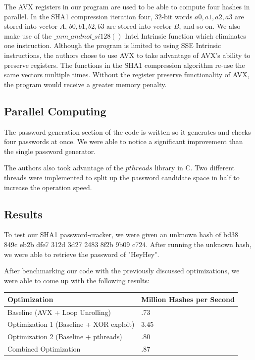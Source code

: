 \documentclass[letterpaper, 10 pt, conference]{ieeeconf}  %
\begin{document}
The AVX registers in our program are used to be able to compute four hashes in parallel.  In the SHA1 compression iteration four, 32-bit words $a0, a1, a2, a3$ are stored into vector $A$, $b0, b1, b2, b3$ are stored into vector $B$, and so on.  We also make use of the $\_mm\_andnot\_si128()$ Intel Intrinsic function which eliminates one instruction.  Although the program is limited to using SSE Intrinsic instructions, the authors chose to use AVX to take advantage of AVX's ability to preserve registers.  The functions in the SHA1 compression algorithm re-use the same vectors multiple times.  Without the register preserve functionality of AVX, the program would receive a greater memory penalty.  

\subsection{Parallel Computing}

The password generation section of the code is written so it generates and checks four passwords at once.  We were able to notice a significant improvement than the single password generator.

The authors also took advantage of the $pthreads$ library in C.  Two different threads were implemented to split up the password candidate space in half to increase the operation speed. 

\subsection{Results}

To test our SHA1 password-cracker, we were given an unknown hash of bd38 849c eb2b dfe7 312d 3d27 2483 8f2b 9b09 c724.  After running the unknown hash, we were able to retrieve the password of "HeyHey".

After benchmarking our code with the previously discussed optimizations, we were able to come up with the following results:

\begin{center}
    \begin{tabular}{| p{4cm} | l |}
        \hline
         Optimization & Million Hashes per Second \\ \hline
        Baseline (AVX + Loop Unrolling) & .73 \\ \hline
        Optimization 1 (Baseline + XOR exploit) & 3.45 \\ \hline
        Optimization 2 (Baseline + pthreads) & .80 \\ \hline
        Combined Optimization & .87 \\
        \hline
    \end{tabular}
\end{center}
\end{document}
